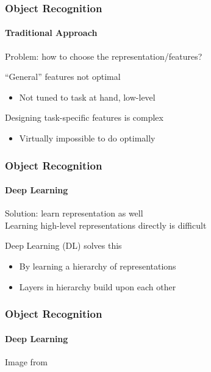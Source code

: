 \documentclass[xetex,professionalfont]{beamer}
\begin{document}

\begin{frame}
\frametitle{Object Recognition}
\framesubtitle{Traditional Approach}

Problem: how to choose the representation/features? %

\bigskip
\enquote{General} features not optimal
\begin{itemize}
	\item Not tuned to task at hand, low-level
\end{itemize}

\bigskip
Designing task-specific features is complex
\begin{itemize}
	\item Virtually impossible to do optimally
\end{itemize}

\end{frame}


\begin{frame}
\frametitle{Object Recognition}
\framesubtitle{Deep Learning}

Solution: learn representation as well\\\medskip %
Learning high-level representations directly is difficult

\bigskip
Deep Learning (DL) solves this
\begin{itemize}
	\item By learning a hierarchy of representations %
	\item Layers in hierarchy build upon each other %
\end{itemize}

\end{frame}


\begin{frame}
\frametitle{Object Recognition}
\framesubtitle{Deep Learning}

\begin{center}
	{\centering Image from \cite{bengio2014}}
\end{center}

\end{frame}
\end{document}
